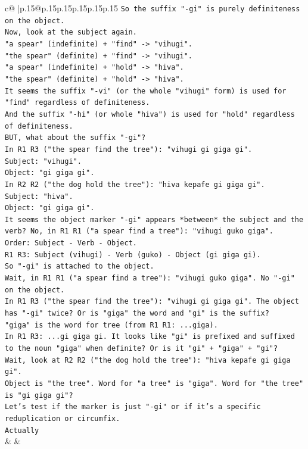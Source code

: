 \documentclass{article}
\begin{document}
{\begin{supertabular}{c@{$\;$}|p{.15\linewidth}@{}p{.15\linewidth}p{.15\linewidth}p{.15\linewidth}p{.15\linewidth}p{.15\linewidth}}
{{{\texttt{So the suffix "{-}gi" is purely definiteness on the object.} \\
\texttt{Now, look at the subject again.} \\
\texttt{"a spear" (indefinite) + "find" {-}> "vihugi".} \\
\texttt{"the spear" (definite) + "find" {-}> "vihugi".} \\
\texttt{"a spear" (indefinite) + "hold" {-}> "hiva".} \\
\texttt{"the spear" (definite) + "hold" {-}> "hiva".} \\
\texttt{It seems the suffix "{-}vi" (or the whole "vihugi" form) is used for "find" regardless of definiteness.} \\
\texttt{And the suffix "{-}hi" (or whole "hiva") is used for "hold" regardless of definiteness.} \\
\texttt{BUT, what about the suffix "{-}gi"?} \\
\texttt{In R1 R3 ("the spear find the tree"): "vihugi gi giga gi".} \\
\texttt{Subject: "vihugi".} \\
\texttt{Object: "gi giga gi".} \\
\texttt{In R2 R2 ("the dog hold the tree"): "hiva kepafe gi giga gi".} \\
\texttt{Subject: "hiva".} \\
\texttt{Object: "gi giga gi".} \\
\texttt{It seems the object marker "{-}gi" appears *between* the subject and the verb? No, in R1 R1 ("a spear find a tree"): "vihugi guko giga".} \\
\texttt{Order: Subject {-} Verb {-} Object.} \\
\texttt{R1 R3: Subject (vihugi) {-} Verb (guko) {-} Object (gi giga gi).} \\
\texttt{So "{-}gi" is attached to the object.} \\
\texttt{Wait, in R1 R1 ("a spear find a tree"): "vihugi guko giga". No "{-}gi" on the object.} \\
\texttt{In R1 R3 ("the spear find the tree"): "vihugi gi giga gi". The object has "{-}gi" twice? Or is "giga" the word and "gi" is the suffix?} \\
\texttt{"giga" is the word for tree (from R1 R1: ...giga).} \\
\texttt{In R1 R3: ...gi giga gi. It looks like "gi" is prefixed and suffixed to the noun "giga" when definite? Or is it "gi" + "giga" + "gi"?} \\
\texttt{Wait, look at R2 R2 ("the dog hold the tree"): "hiva kepafe gi giga gi".} \\
\texttt{Object is "the tree". Word for "a tree" is "giga". Word for "the tree" is "gi giga gi"?} \\
\texttt{Let's test if the marker is just "{-}gi" or if it's a specific reduplication or circumfix.} \\
\texttt{Actually} \\
            }
        }
    }
    & & \\ \\


\end{supertabular}}
\end{document}
